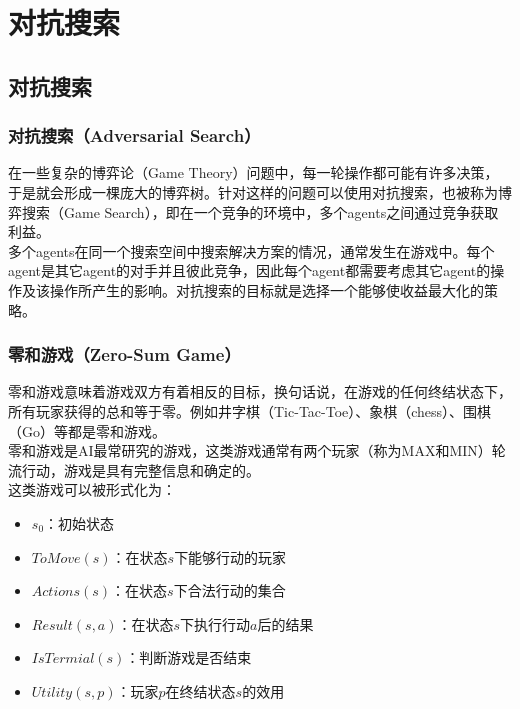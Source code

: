 \chapter{对抗搜索}

\section{对抗搜索}

\subsection{对抗搜索（Adversarial Search）}

在一些复杂的博弈论（Game Theory）问题中，每一轮操作都可能有许多决策，于是就会形成一棵庞大的博弈树。针对这样的问题可以使用对抗搜索，也被称为博弈搜索（Game Search），即在一个竞争的环境中，多个agents之间通过竞争获取利益。\\

多个agents在同一个搜索空间中搜索解决方案的情况，通常发生在游戏中。每个agent是其它agent的对手并且彼此竞争，因此每个agent都需要考虑其它agent的操作及该操作所产生的影响。对抗搜索的目标就是选择一个能够使收益最大化的策略。\\

\subsection{零和游戏（Zero-Sum Game）}

零和游戏意味着游戏双方有着相反的目标，换句话说，在游戏的任何终结状态下，所有玩家获得的总和等于零。例如井字棋（Tic-Tac-Toe）、象棋（chess）、围棋（Go）等都是零和游戏。\\

零和游戏是AI最常研究的游戏，这类游戏通常有两个玩家（称为MAX和MIN）轮流行动，游戏是具有完整信息和确定的。\\

这类游戏可以被形式化为：

\begin{itemize}
    \item $ s_0 $：初始状态
    \item $ ToMove(s) $：在状态$ s $下能够行动的玩家
    \item $ Actions(s) $：在状态$ s $下合法行动的集合
    \item $ Result(s, a) $：在状态$ s $下执行行动$ a $后的结果
    \item $ IsTermial(s) $：判断游戏是否结束
    \item $ Utility(s, p) $：玩家$ p $在终结状态$ s $的效用
\end{itemize}


